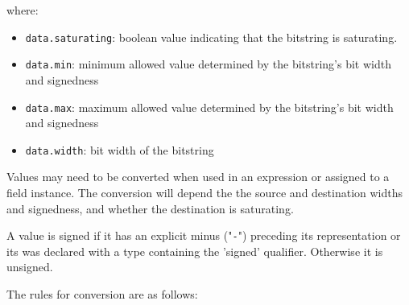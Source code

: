 \documentclass[12pt]{article}
\begin{document}
where:

\begin{itemize}
\item
\texttt{data.saturating}: boolean value indicating that the bitstring is
saturating.
\item
\texttt{data.min}: minimum allowed value determined by the bitstring's bit width
and signedness
\item
\texttt{data.max}: maximum allowed value determined by the bitstring's bit width
and signedness
\item
\texttt{data.width}: bit width of the bitstring
\end{itemize}


Values may need to be converted when used in an expression or assigned to a
field instance. The conversion will depend the the source and destination widths
and signedness, and whether the destination is saturating.

A value is signed if it has an explicit minus ("\texttt{-}") preceding its
representation or its was declared with a type containing the 'signed'
qualifier. Otherwise it is unsigned.

The rules for conversion are as follows:
\end{document}

